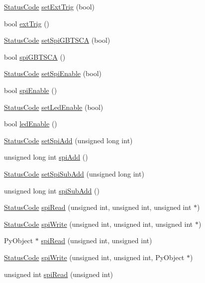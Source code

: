 \begin{DoxyCompactItemize}
\item 
\hyperlink{classStatusCode}{StatusCode} \hyperlink{classSeqPGA_a9744b6cff04738474556cc2153af19de}{setExtTrig} (bool)
\item 
bool \hyperlink{classSeqPGA_ae2e0917c379649d106539cc3b8b9ca3c}{extTrig} ()
\item 
\hyperlink{classStatusCode}{StatusCode} \hyperlink{classSeqPGA_ae5449d6970bffd8de3670a8a1ce6942d}{setSpiGBTSCA} (bool)
\item 
bool \hyperlink{classSeqPGA_a2eadc7868d61ff79ea566b3fbfd977a5}{spiGBTSCA} ()
\item 
\hyperlink{classStatusCode}{StatusCode} \hyperlink{classSeqPGA_a39a6cf702c9185793f59a8a05f3a9de7}{setSpiEnable} (bool)
\item 
bool \hyperlink{classSeqPGA_a6be337fc18199d758430bd178542abb4}{spiEnable} ()
\item 
\hyperlink{classStatusCode}{StatusCode} \hyperlink{classSeqPGA_a2e256a39e1bc4fbfa23de3760a7bd19a}{setLedEnable} (bool)
\item 
bool \hyperlink{classSeqPGA_a45ec726e141bfef3fa59c4b2d36a0657}{ledEnable} ()
\item 
\hyperlink{classStatusCode}{StatusCode} \hyperlink{classSeqPGA_ac998ce3a6d9b5f2e88cc8393f8c1df53}{setSpiAdd} (unsigned long int)
\item 
unsigned long int \hyperlink{classSeqPGA_af31a6428f365c1f8ded0ee381d249cde}{spiAdd} ()
\item 
\hyperlink{classStatusCode}{StatusCode} \hyperlink{classSeqPGA_a5db205f213770dd3fb3fcfb8ff7981df}{setSpiSubAdd} (unsigned long int)
\item 
unsigned long int \hyperlink{classSeqPGA_a6422961edd45abad31e6d79e0564c48f}{spiSubAdd} ()
\item 
\hyperlink{classStatusCode}{StatusCode} \hyperlink{classSeqPGA_ab3d0e5e5d4014bc7a92588a76b8713d4}{spiRead} (unsigned int, unsigned int, unsigned int $\ast$)
\item 
\hyperlink{classStatusCode}{StatusCode} \hyperlink{classSeqPGA_ad4421841ce4ce8b88ad13f63216f0743}{spiWrite} (unsigned int, unsigned int, unsigned int $\ast$)
\item 
PyObject $\ast$ \hyperlink{classSeqPGA_a61df84df1bd134d1bda2133d82bafb2e}{spiRead} (unsigned int, unsigned int)
\item 
\hyperlink{classStatusCode}{StatusCode} \hyperlink{classSeqPGA_a7b8af951501ccd0f763e131276c543ad}{spiWrite} (unsigned int, unsigned int, PyObject $\ast$)
\item 
unsigned int \hyperlink{classSeqPGA_a654a40dc597227e59458631f49ff598f}{spiRead} (unsigned int)

\end{DoxyCompactItemize}
